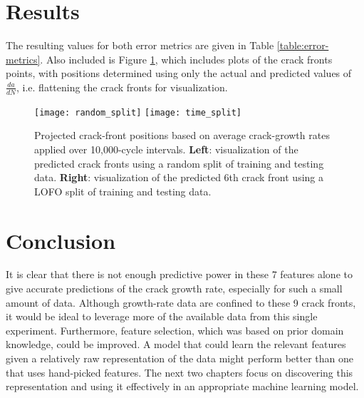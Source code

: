 \section{Results}
The resulting values for both error metrics are given in Table \ref{table:error-metrics}.  Also included is Figure \ref{fig:crack_front_prediction}, which includes plots of the crack fronts points, with positions determined using only the actual and predicted values of $\frac{da}{dN}$, i.e. flattening the crack fronts for visualization.

\begin{figure}[b]
  \centering
  \texttt{[image: random\_split]}
  \texttt{[image: time\_split]}

  \caption{Projected crack-front positions based on average crack-growth rates applied over 10,000-cycle intervals.
           \textbf{Left}: visualization of the predicted crack fronts using a random split of training
and testing data.
           \textbf{Right}: visualization of the predicted 6th crack front using a LOFO split of training and testing data.}
  \label{fig:crack_front_prediction}
\end{figure}

\section{Conclusion}
It is clear that there is not enough predictive power in these 7 features alone to give accurate predictions of the crack growth rate, especially for such a small amount of data.  Although growth-rate data are confined to these 9 crack fronts, it would be ideal to leverage more of the available data from this single experiment.  Furthermore, feature selection, which was based on prior domain knowledge, could be improved.  A model that could learn the relevant features given a relatively raw representation of the data might perform better than one that uses hand-picked features.  The next two chapters focus on discovering this representation and using it effectively in an appropriate machine learning model.



